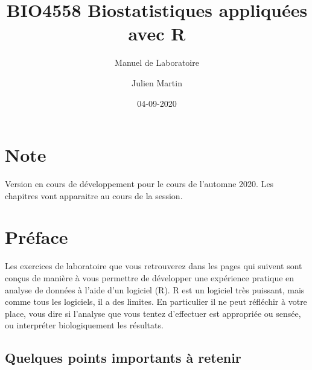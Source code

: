 \documentclass[12pt,]{book}
\title{BIO4558 Biostatistiques appliquées avec R}
\subtitle{Manuel de Laboratoire}
\author{Julien Martin}
\date{04-09-2020}
\begin{document}
\maketitle



{
\setcounter{tocdepth}{1}
\tableofcontents
}
\hypertarget{note}{%
\chapter*{Note}\label{note}}


Version en cours de développement pour le cours de l'automne 2020. Les chapitres vont apparaitre au cours de la session.

\hypertarget{pruxe9face}{%
\chapter*{Préface}\label{pruxe9face}}


Les exercices de laboratoire que vous retrouverez dans les pages qui suivent sont conçus de manière à vous permettre de développer une expérience pratique en analyse de données à l'aide d'un logiciel (R).
R est un logiciel très puissant, mais comme tous les logiciels, il a des limites.
En particulier il ne peut réfléchir à votre place, vous dire si l'analyse que vous tentez d'effectuer est appropriée ou sensée, ou interpréter biologiquement les résultats.

\hypertarget{quelques-points-importants-uxe0-retenir}{%
\section*{Quelques points importants à retenir}\label{quelques-points-importants-uxe0-retenir}}
\end{document}
